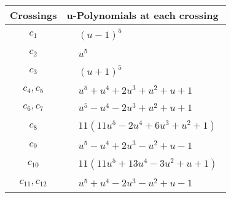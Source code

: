 \documentclass[1p]{elsarticle_modified}
\theoremstyle{definition}
\begin{document}
\begin{tabular}{m{50pt}|m{274pt}}
Crossings & \hspace{64pt}u-Polynomials at each crossing \\
\hline $$\begin{aligned}c_{1}\end{aligned}$$&$\begin{aligned}
&(u-1)^5
\end{aligned}$\\
\hline $$\begin{aligned}c_{2}\end{aligned}$$&$\begin{aligned}
&u^5
\end{aligned}$\\
\hline $$\begin{aligned}c_{3}\end{aligned}$$&$\begin{aligned}
&(u+1)^5
\end{aligned}$\\
\hline $$\begin{aligned}c_{4},c_{5}\end{aligned}$$&$\begin{aligned}
&u^5+u^4+2 u^3+u^2+u+1
\end{aligned}$\\
\hline $$\begin{aligned}c_{6},c_{7}\end{aligned}$$&$\begin{aligned}
&u^5- u^4-2 u^3+u^2+u+1
\end{aligned}$\\
\hline $$\begin{aligned}c_{8}\end{aligned}$$&$\begin{aligned}
&11(11 u^5-2 u^4+6 u^3+u^2+1)
\end{aligned}$\\
\hline $$\begin{aligned}c_{9}\end{aligned}$$&$\begin{aligned}
&u^5- u^4+2 u^3- u^2+u-1
\end{aligned}$\\
\hline $$\begin{aligned}c_{10}\end{aligned}$$&$\begin{aligned}
&11(11 u^5+13 u^4-3 u^2+u+1)
\end{aligned}$\\
\hline $$\begin{aligned}c_{11},c_{12}\end{aligned}$$&$\begin{aligned}
&u^5+u^4-2 u^3- u^2+u-1
\end{aligned}$\\
\hline
\end{tabular}\\~\\
\end{document}
